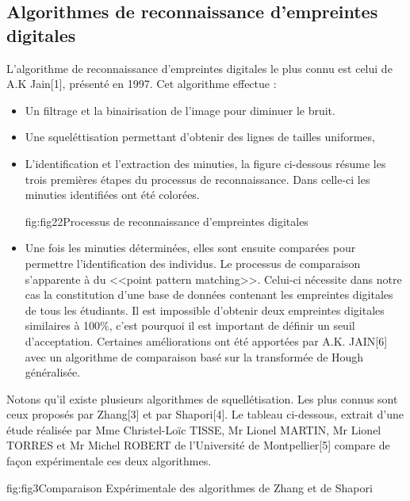 \documentclass[overfullbox]{polytech/polytech}
\begin{document}
\subsection{Algorithmes de reconnaissance d’empreintes digitales}
L'algorithme de reconnaissance d'empreintes digitales le plus connu est celui de A.K Jain[1], présenté en 1997. Cet algorithme effectue :
\begin{itemize}
 	\item Un filtrage et la binairisation de l’image pour diminuer le bruit.
    \item Une squeléttisation permettant d'obtenir des lignes de tailles uniformes,
    \item L'identification et l'extraction des minuties,
    la figure ci-dessous résume les trois premières étapes du processus de reconnaissance. Dans celle-ci les minuties identifiées ont été colorées.
    
    \begin{Figure}{fig:fig22}{Processus de reconnaissance d'empreintes digitales}
	\end{Figure}
	
    \item Une fois les minuties déterminées, elles sont ensuite comparées pour permettre l'identification des individus. Le processus de comparaison  s'apparente à du <<point pattern matching>>. Celui-ci nécessite dans notre cas la constitution d'une base de données contenant les empreintes digitales de tous les étudiants. Il est impossible d'obtenir deux empreintes digitales similaires à 100\%, c'est pourquoi il est important de définir un seuil d'acceptation. Certaines améliorations ont été apportées par A.K. JAIN[6] avec un algorithme de comparaison basé sur la transformée de Hough généralisée.
    \newline 
\end{itemize}


Notons qu'il existe plusieurs algorithmes de squellétisation. Les plus connus sont ceux proposés par Zhang[3] et par Shapori[4]. Le tableau ci-dessous, extrait d'une étude réalisée par Mme Christel-Loïc TISSE, Mr Lionel MARTIN, Mr Lionel TORRES et Mr Michel ROBERT de l'Université de Montpellier[5] compare de façon expérimentale ces deux algorithmes. 

\begin{Figure}{fig:fig3}{Comparaison Expérimentale des algorithmes de Zhang et de Shapori}
\end{Figure}
\end{document}
